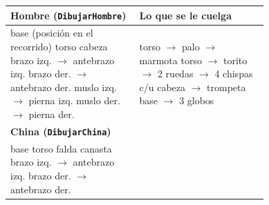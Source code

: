 \documentclass[11pt,a4paper]{article}
\begin{document}
\begin{figure}[H]
  \centering
  \small
  \begin{tabular}{|p{0.44\linewidth}|p{0.44\linewidth}|}
    \hline
    \textbf{Hombre (\texttt{DibujarHombre})} & \textbf{Lo que se le cuelga} \\ \hline
    \parbox[t]{\linewidth}{\ttfamily
      base (posición en el recorrido)\\
      \hspace*{1em}torso\\
      \hspace*{2em}cabeza\\
      \hspace*{2em}brazo izq. \(\rightarrow\) antebrazo izq.\\
      \hspace*{2em}brazo der. \(\rightarrow\) antebrazo der.\\
      \hspace*{2em}muslo izq. \(\rightarrow\) pierna izq.\\
      \hspace*{2em}muslo der. \(\rightarrow\) pierna der.\vspace{2pt}} &
    \parbox[t]{\linewidth}{\ttfamily
      torso \(\rightarrow\) palo \(\rightarrow\) marmota\\
      torso \(\rightarrow\) torito \(\rightarrow\) 2 ruedas\\
      \hspace*{1em}\(\rightarrow\) 4 chispas c/u\\
      cabeza \(\rightarrow\) trompeta\\
      base \(\rightarrow\) 3 globos\vspace{2pt}} \\ \hline
    \textbf{China (\texttt{DibujarChina})} & \\ \hline
    \parbox[t]{\linewidth}{\ttfamily
      base\\
      \hspace*{1em}torso\\
      \hspace*{2em}falda\\
      \hspace*{2em}canasta\\
      \hspace*{2em}brazo izq. \(\rightarrow\) antebrazo izq.\\
      \hspace*{2em}brazo der. \(\rightarrow\) antebrazo der.\vspace{2pt}} &

\end{tabular}
\end{figure}
\end{document}
